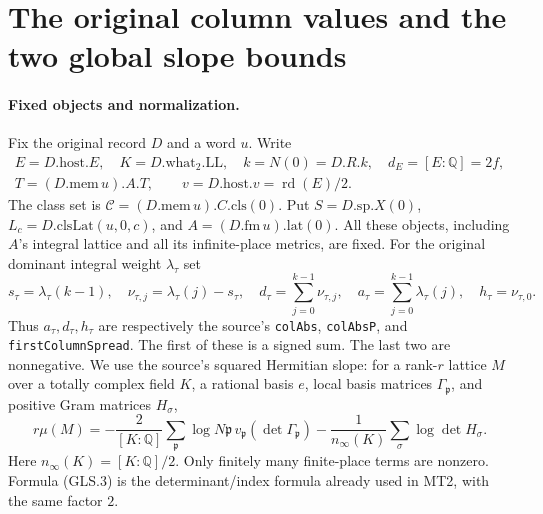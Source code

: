 \section{The original column values and the two global slope bounds}
\label{sec:global-slope}


\paragraph{Fixed objects and normalization.}
Fix the original record $D$ and a word $u$.  Write
\[
\begin{gathered}
 E=D.\mathrm{host}.E,\quad K=D.\mathrm{what}_2.\mathrm{LL},\quad
 k=N(0)=D.R.k,\quad d_E=[E:\mathbb Q]=2f,\\
 T=(D.\mathrm{mem}\,u).A.T,\qquad
 v=D.\mathrm{host}.v=\operatorname{rd}(E)/2.
\end{gathered}
 \tag{GLS.1}
\]
The class set is $\mathcal C=(D.\mathrm{mem}\,u).C.\mathrm{cls}(0)$.
Put $S=D.\mathrm{sp}.X(0)$, $L_c=D.\mathrm{clsLat}(u,0,c)$, and
$A=(D.\mathrm{fm}\,u).\mathrm{lat}(0)$.  All these objects, including
$A$'s integral lattice and all its infinite-place metrics, are fixed.
For the original dominant integral weight $\lambda_\tau$ set
\[
 s_\tau=\lambda_\tau(k-1),\quad
 \nu_{\tau,j}=\lambda_\tau(j)-s_\tau,\quad
 d_\tau=\sum_{j=0}^{k-1}\nu_{\tau,j},\quad
 a_\tau=\sum_{j=0}^{k-1}\lambda_\tau(j),\quad
 h_\tau=\nu_{\tau,0}.
 \tag{GLS.2}
\]
Thus $a_\tau,d_\tau,h_\tau$ are respectively the source's
\texttt{colAbs}, \texttt{colAbsP}, and \texttt{firstColumnSpread}.
The first of these is a signed sum.  The last two are nonnegative.
We use the source's squared Hermitian slope: for a rank-$r$ lattice
$M$ over a totally complex field $K$, a rational basis $e$, local basis
matrices $\Gamma_\mathfrak p$, and positive Gram matrices $H_\sigma$,
\[
 r\mu(M)=-\frac{2}{[K:\mathbb Q]}
       \sum_\mathfrak p\log N\mathfrak p\,
                      v_\mathfrak p(\det\Gamma_\mathfrak p)
       -\frac1{n_\infty(K)}\sum_\sigma\log\det H_\sigma.
 \tag{GLS.3}
\]
Here $n_\infty(K)=[K:\mathbb Q]/2$.  Only finitely many finite-place
terms are nonzero.  Formula (GLS.3) is the determinant/index formula
already used in MT2, with the same factor $2$.

